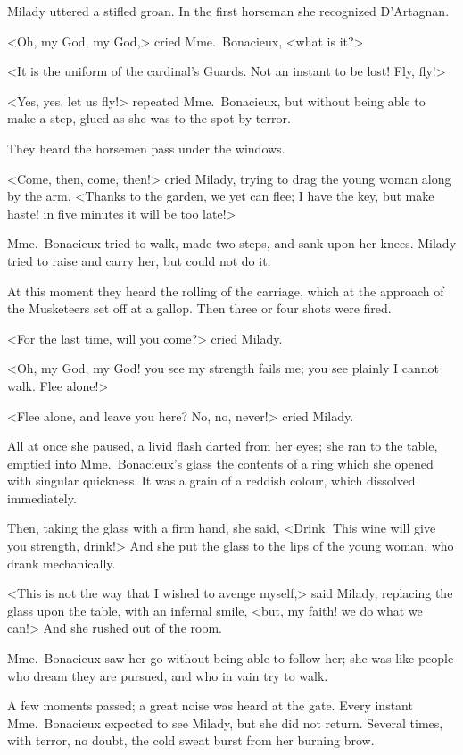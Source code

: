 Milady uttered a stifled groan. In the first horseman she recognized D'Artagnan. 

<Oh, my God, my God,> cried Mme.~Bonacieux, <what is it?> 

<It is the uniform of the cardinal's Guards. Not an instant to be lost! Fly, fly!> 

<Yes, yes, let us fly!> repeated Mme.~Bonacieux, but without being able to make a step, glued as she was to the spot by terror. 

They heard the horsemen pass under the windows. 

<Come, then, come, then!> cried Milady, trying to drag the young woman along by the arm. <Thanks to the garden, we yet can flee; I have the key, but make haste! in five minutes it will be too late!> 

Mme.~Bonacieux tried to walk, made two steps, and sank upon her knees. Milady tried to raise and carry her, but could not do it. 

At this moment they heard the rolling of the carriage, which at the approach of the Musketeers set off at a gallop. Then three or four shots were fired. 

<For the last time, will you come?> cried Milady. 

<Oh, my God, my God! you see my strength fails me; you see plainly I cannot walk. Flee alone!> 

<Flee alone, and leave you here? No, no, never!> cried Milady. 

All at once she paused, a livid flash darted from her eyes; she ran to the table, emptied into Mme.~Bonacieux's glass the contents of a ring which she opened with singular quickness. It was a grain of a reddish colour, which dissolved immediately. 

Then, taking the glass with a firm hand, she said, <Drink. This wine will give you strength, drink!> And she put the glass to the lips of the young woman, who drank mechanically. 

<This is not the way that I wished to avenge myself,> said Milady, replacing the glass upon the table, with an infernal smile, <but, my faith! we do what we can!> And she rushed out of the room. 

Mme.~Bonacieux saw her go without being able to follow her; she was like people who dream they are pursued, and who in vain try to walk. 

A few moments passed; a great noise was heard at the gate. Every instant Mme.~Bonacieux expected to see Milady, but she did not return. Several times, with terror, no doubt, the cold sweat burst from her burning brow. 

